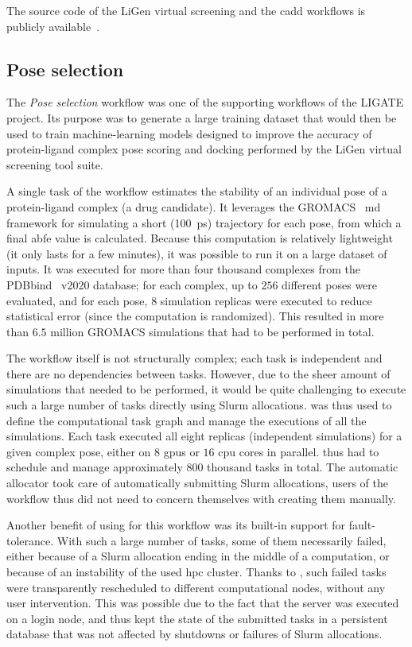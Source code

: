 The source code of the LiGen virtual screening and the \gls{cadd} workflows is
publicly available~\cite{cadd-workflow}.

\subsection{Pose selection}
The \emph{Pose selection} workflow was one of the supporting workflows of the LIGATE project. Its
purpose was to generate a large training dataset that would then be used to train machine-learning
models designed to improve the accuracy of protein-ligand complex pose scoring and docking
performed by the LiGen virtual screening tool suite.

A single task of the workflow estimates the stability of an individual pose of a protein-ligand
complex (a drug candidate). It leverages the GROMACS~\cite{gromacs}
\gls{md} framework for simulating a short (\SI{100}{\pico\second}) trajectory for
each pose, from which a final \gls{abfe} value is calculated. Because this computation
is relatively lightweight (it only lasts for a few minutes), it was possible to run it on a large
dataset of inputs. It was executed for more than four thousand complexes from the
PDBbind~\cite{pdbbind} v2020 database; for each complex, up to $256$
different poses were evaluated, and for each pose, $8$ simulation replicas were
executed to reduce statistical error (since the computation is randomized). This resulted in more
than $6.5$ million GROMACS simulations that had to be performed in total.

The workflow itself is not structurally complex; each task is independent and there are no
dependencies between tasks. However, due to the sheer amount of simulations that needed to be
performed, it would be quite challenging to execute such a large number of tasks directly using
Slurm allocations. \hyperqueue{} was thus used to define the computational task graph and
manage the executions of all the simulations. Each task executed all eight replicas (independent
simulations) for a given complex pose, either on $8$ \glspl{gpu} or
$16$ \gls{cpu} cores in parallel. \hyperqueue{} thus had
to schedule and manage approximately $800$ thousand tasks in total. The automatic
allocator took care of automatically submitting Slurm allocations, users of the workflow thus did
not need to concern themselves with creating them manually.

Another benefit of using \hyperqueue{} for this workflow was its built-in support for
fault-tolerance. With such a large number of tasks, some of them necessarily failed, either because
of a Slurm allocation ending in the middle of a computation, or because of an instability of the
used \gls{hpc} cluster. Thanks to \hyperqueue{}, such failed tasks were
transparently rescheduled to different computational nodes, without any user intervention. This was
possible due to the fact that the \hq{} server was executed on a login node, and
thus kept the state of the submitted tasks in a persistent database that was not affected by
shutdowns or failures of Slurm allocations.

